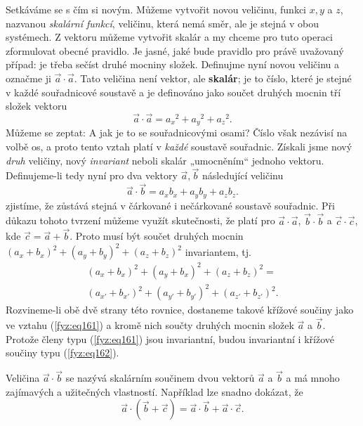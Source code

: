     Setkáváme se s čím si novým. Můžeme vytvořit novou veličinu, funkci \(x, y\) a \(z\), nazvanou 
    \emph{skalární funkcí}, veličinu, která nemá směr, ale je stejná v obou systémech. Z vektoru 
    můžeme vytvořit skalár a my chceme pro tuto operaci zformulovat obecné pravidlo. Je jasné, jaké 
    bude pravidlo pro právě uvažovaný případ: je třeba sečíst druhé mocniny složek. Definujme nyní 
    novou veličinu a označme ji \(\vec{a}\cdot\vec{ a}\). Tato veličina není vektor, ale 
    \textbf{skalár}; je to číslo, které je stejné v každé souřadnicové soustavě a je definováno 
    jako součet druhých mocnin tří složek vektoru
    \begin{equation}\label{fyz:eq161}
      \vec{a}\cdot\vec{a} = {a_x}^2+{a_y}^2+{a_z}^2.
    \end{equation}
    Můžeme se zeptat: A jak je to se souřadnicovými osami? Číslo však nezávisí na volbě os, a proto 
    tento vztah platí v \emph{každé} soustavě souřadnic. Získali jsme nový \emph{druh} veličiny, 
    nový \emph{invariant} neboli skalár „umocněním“ jednoho vektoru. Definujeme-li tedy nyní pro 
    dva vektory \(\vec{a}, \vec{b}\) následující veličinu
    \begin{equation}\label{fyz:eq162}
      \vec{a}\cdot\vec{b} = a_xb_x+a_yb_y+a_zb_z.
    \end{equation}
    zjistíme, že zůstává stejná v čárkované i nečárkované soustavě souřadnic. Při důkazu tohoto 
    tvrzení můžeme využít skutečnosti, že platí pro \(\vec{a}\cdot\vec{a}\), 
    \(\vec{b}\cdot\vec{b}\) a \(\vec{c}\cdot\vec{c}\), kde \(\vec{c}=\vec{a} + \vec{b}\). Proto 
    musí být součet druhých mocnin \((a_x + b_x)^2 + (a_y + b_y)^2 + (a_z + b_z)^2\) invariantem, 
    tj.
    \begin{equation*}  %
      \begin{multlined}
        (a_x + b_x)^2       + (a_y + b_x)^2       + (a_z + b_z)^2       =    \\   
        (a_{x'} + b_{x'})^2 + (a_{y'} + b_{y'})^2 + (a_{z'} + b_{z'})^2.
      \end{multlined}
    \end{equation*}
    Rozvineme-li obě dvě strany této rovnice, dostaneme takové křížové součiny jako ve vztahu 
    (\ref{fyz:eq161}) a kromě nich součty druhých mocnin složek \(\vec{a}\) a \(\vec{b}\). Protože 
    členy typu (\ref{fyz:eq161}) jsou invariantní, budou invariantní i křížové součiny typu 
    (\ref{fyz:eq162}).
    
    Veličina \(\vec{a}\cdot\vec{b}\) se nazývá skalárním součinem dvou vektorů \(\vec{a}\) a 
    \(\vec{b}\) a má mnoho zajímavých a užitečných vlastností. Například lze snadno dokázat, že
    \begin{equation}\label{fyz:eq164}
      \vec{a}\cdot(\vec{b} + \vec{c}) =  \vec{a}\cdot\vec{b} + \vec{a}\cdot\vec{c}.
    \end{equation}


